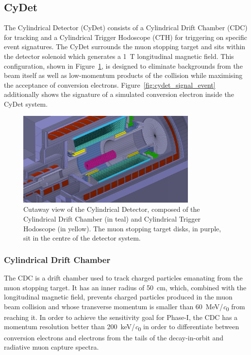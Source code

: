 \subsection{CyDet}
The Cylindrical Detector (CyDet) consists of a Cylindrical Drift Chamber (CDC)
for tracking and a Cylindrical Trigger Hodoscope (CTH) for triggering on
specific event signatures. The CyDet surrounds the muon stopping target and sits
within the detector solenoid which generates a \SI{1}{\tesla} longitudinal
magnetic field. This configuration, shown in Figure~\ref{fig:cydet}, is designed
to eliminate backgrounds from the beam itself as well as low-momentum products
of the collision while maximising the acceptance of conversion electrons.
Figure~\ref{fig:cydet_signal_event} additionally shows the signature of a
simulated conversion electron inside the CyDet system.

\begin{figure}
    \centering
    \includegraphics[width=0.8\textwidth]{chapter2/cydet_recolor.png}
    \caption{ Cutaway view of the Cylindrical Detector, composed of the
        Cylindrical Drift Chamber (in teal) and Cylindrical Trigger Hodoscope
        (in yellow). The muon stopping target disks, in purple, sit in the
        centre of the detector system. }
    \label{fig:cydet}
\end{figure}

\subsubsection{Cylindrical Drift Chamber}
The CDC is a drift chamber used to track charged particles emanating from the
muon stopping target. It has an inner radius of \SI{50}{\cm}, which, combined
with the longitudinal magnetic field, prevents charged particles produced in the
muon beam collision and whose transverse momentum is smaller than
\SI{60}{\MeV/\clight} from reaching it. In order to achieve the sensitivity goal
for Phase-I, the CDC has a momentum resolution better than
\SI{200}{\keV/\clight} in order to differentiate between conversion electrons
and electrons from the tails of the decay-in-orbit and radiative muon capture
spectra. 

